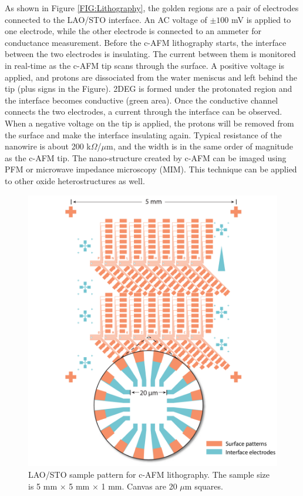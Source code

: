 \documentclass[pdflatex, sectionletters, 12pt, final, phd]{pittetd}    %
\begin{document}
As shown in Figure \ref{FIG:Lithography}, the golden regions are a pair of electrodes connected to the LAO/STO interface. An AC voltage of $\pm100$ mV is applied to one electrode, while the other electrode is connected to an ammeter for conductance measurement. Before the c-AFM lithography starts, the interface between the two electrodes is insulating. The current between them is monitored in real-time as the c-AFM tip scans through the surface. A positive voltage is applied, and protons are dissociated from the water meniscus and left behind the tip (plus signs in the Figure). 2DEG is formed under the protonated region and the interface becomes conductive (green area). Once the conductive channel connects the two electrodes, a current through the interface can be observed. When a negative voltage on the tip is applied, the protons will be removed from the surface and make the interface insulating again. Typical resistance of the nanowire is about 200 k$\Omega$/$\mu$m, and the width is in the same order of magnitude as the c-AFM tip\cite{cen2008nanoscale}. The nano-structure created by c-AFM can be imaged using PFM\cite{huang2015electric} or microwave impedance microscopy (MIM)\cite{jiang2017direct}. This technique can be applied to other oxide heterostructures as well\cite{li2014nanoscale, chen2018extreme}.

\begin{figure}[p]
	\centering
	\includegraphics[width=1\textwidth]{Drawing/Regular.pdf}
	\caption[LAO/STO sample pattern for c-AFM lithography]{LAO/STO sample pattern for c-AFM lithography. The sample size is 5 mm $\times$ 5 mm $\times$ 1 mm. Canvas are 20 $\mu$m squares.}
	\label{FIG:Regular}
\end{figure}
\end{document}
